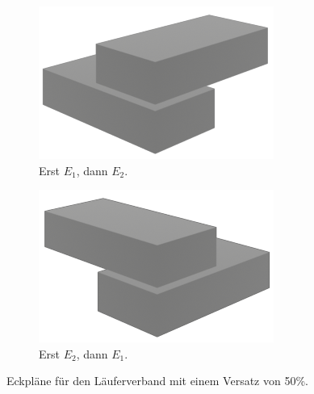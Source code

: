 \begin{figure}[ht!]
    \centering
    \begin{subfigure}[b]{0.3\columnwidth}
      \includegraphics[width=\columnwidth]{fig/concept_streched_bond_corner.png}
      \caption{Erst \(E_1\), dann \(E_2\).}
      \label{fig:concept:concept_streched_bond_corner}
    \end{subfigure}
    \hfil
    \begin{subfigure}[b]{0.3\columnwidth}
      \includegraphics[width=\columnwidth]{fig/concept_streched_bond_corner_inverse.png}
      \caption{Erst \(E_2\), dann \(E_1\).}
      \label{fig:concept:concept_streched_bond_corner_inverse}
    \end{subfigure}
    \hfil
  \caption{Eckpläne für den Läuferverband mit einem Versatz von 50\%.}
  \label{fig:concept:corner_bond}
\end{figure}

